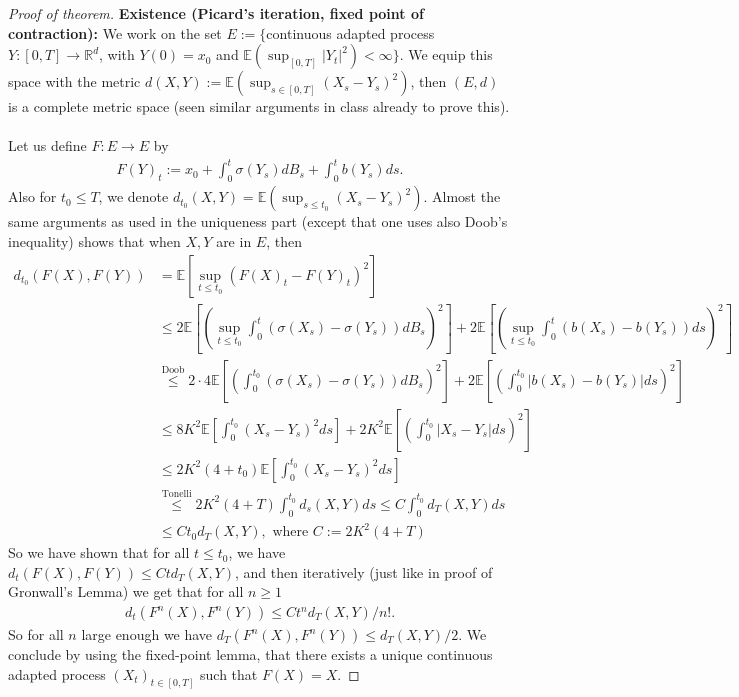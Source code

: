 \documentclass[../mainfile.tex]{subfiles}
\begin{document}
\begin{proof}[Proof of theorem]
\textbf{Existence (Picard's iteration, fixed point of contraction):} We work on the set $E:= \{$continuous adapted process $Y:[0,T] \to \mathbb{R}^d$,  with $Y(0)=x_0$ and $\mathbb{E}( \sup_{[0,T]} |Y_t|^2) < \infty \}$. We equip this space with the metric $d(X,Y):= \mathbb{E}( \sup_{s \in [0,T]} (X_s-Y_s)^2)$, then $(E,d)$ is a complete metric space (seen similar arguments in class already to prove this). 
\\\\
Let us define $F: E \to E$ by  
\begin{align*}
F(Y)_t:= x_0 + \int_0^t \sigma (Y_s) d B_s + \int_0^t b(Y_s)ds.
\end{align*}
Also for $t_0 \leq T$, we denote $d_{t_0} (X,Y)= \mathbb{E}( \sup_{s \leq t_0}(X_s-Y_s)^2).$ Almost the same arguments as used in the uniqueness part (except that one uses also Doob's inequality) shows that when $X,Y$ are in $E$, then  
\begin{align*}
d_{t_0}(F(X),F(Y)) & = \mathbb{E}[ \sup_{t \leq t_0} (F(X)_t-F(Y)_t)^2] \\
& \leq 2 \mathbb{E} \left[ \left( \sup_{t \leq t_0} \int_0^t( \sigma (X_s)- \sigma(Y_s))dB_s\right)^2 \right]+ 2 \mathbb{E} \left[ \left( \sup_{t \leq t_0} \int_0^t( b (X_s)- b(Y_s))ds\right)^2 \right] \\
& \overset{\text{Doob}}\leq 2 \cdot 4 \mathbb{E}\left[ \left( \int_0^{t_0} ( \sigma(X_s)-\sigma(Y_s)) d B_s\right)^2 \right] + 2 \mathbb{E} \left[ \left( \int_0^{t_0} |b(X_s)-b(Y_s)|ds\right)^2 \right] \\
& \leq 8K^2 \mathbb{E}\left[ \int_0^{t_0} (X_s-Y_s)^2ds \right] + 2K^2 \mathbb{E} \left[  \left( \int_0^{t_0} |X_s-Y_s|ds \right)^2 \right] \\
& \leq 2K^2(4+t_0) \mathbb{E} \left[ \int_0^{t_0} (X_s-Y_s)^2 ds \right]  \\
& \overset{\text{Tonelli}}\leq 2K^2(4+T) \int_0^{t_0} d_s(X,Y)ds \leq C \int_0^{t_0} d_T(X,Y)ds \\
& \leq C t_0 d_T(X,Y), \text{ where } C:= 2K^2(4+T)
\end{align*} 
So we have shown that for all $t \leq t_0$, we have $d_t(F(X),F(Y)) \leq C t d_T(X,Y)$, and then iteratively (just like in proof of Gronwall's Lemma) we get that for all $n \geq 1$ 
\begin{align*}
d_t(F^n(X),F^n(Y)) \leq Ct^n d_T (X,Y)/n!.
\end{align*}
So for all $n$ large enough we have $d_T(F^n(X),F^n(Y)) \leq d_T(X,Y)/2$. We conclude by using the fixed-point lemma, that there exists a unique continuous adapted process $(X_t)_{t \in [0,T]}$ such that $F(X)=X$.
\end{proof}
\newpage
\end{document}
